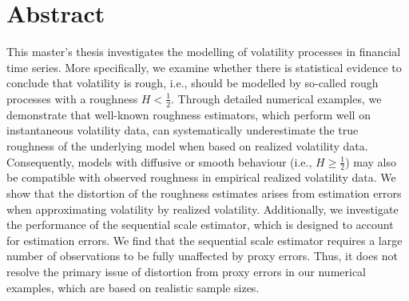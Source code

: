 \documentclass{article}
\begin{document}
\section*{Abstract}
This master's thesis investigates the modelling of volatility processes in financial time series. More specifically, we examine whether there is statistical evidence to conclude that volatility is rough, i.e., should be modelled by so-called rough processes with a roughness $H<\frac{1}{2}$. Through detailed numerical examples, we demonstrate that well-known roughness estimators, which perform well on instantaneous volatility data, can systematically underestimate the true roughness of the underlying model when based on realized volatility data. Consequently, models with diffusive or smooth behaviour (i.e., $H\geq \frac{1}{2}$) may also be compatible with observed roughness in empirical realized volatility data. We show that the distortion of the roughness estimates arises from estimation errors when approximating volatility by realized volatility. Additionally, we investigate the performance of the sequential scale estimator, which is designed to account for estimation errors. We find that the sequential scale estimator requires a large number of observations to be fully unaffected by proxy errors. Thus, it does not resolve the primary issue of distortion from proxy errors in our numerical examples, which are based on realistic sample sizes.
\newpage
\tableofcontents
\newpage
{}
\end{document}
